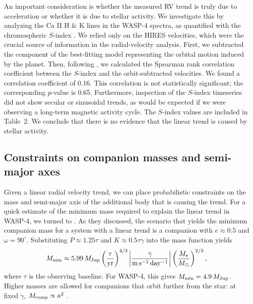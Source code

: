 \documentclass[12pt,twocolumn,tighten]{aastex62}
\begin{document}
An important consideration is whether the measured RV trend is truly
due to acceleration or whether it is due to stellar activity.  We
investigate this by analyzing the Ca II H \& K lines in the WASP-4
spectra, as quantified with the chromospheric $S$-index
\citep{wright_chromospheric_2004}.  We relied only on the HIRES
velocities, which were the crucial source of information in the
radial-velocity analysis.  First, we subtracted the component of the
best-fitting model representing the orbital motion induced by the
planet.  Then, following
\citet{bryan_statistics_2016,bryan_excess_2019}, we calculated the
Spearman rank correlation coefficient between the $S$-index and the
orbit-subtracted velocities.  We found a correlation coefficient of
0.16. This correlation is not statistically significant; the
corresponding $p$-value is 0.65.  Furthermore, inspection of the
$S$-index timeseries did not show secular or sinusoidal trends, as
would be expected if we were observing a long-term magnetic activity
cycle.  The $S$-index values are included in Table~2.  We conclude
that there is no evidence that the linear trend is caused by stellar
activity.

\subsection{Constraints on companion masses and semi-major axes}

Given a linear radial velocity trend, we can place probabilistic
constraints on the mass and semi-major axis of the additional body
that is causing the trend.  For a quick estimate of the minimum mass
required to explain the linear trend in WASP-4, we turned to
\citet{feng_california_2015}.  As they discussed, the scenario that
yields the minimum companion mass for a system with a linear trend is
a companion with $e\approx0.5$ and $\omega=90^\circ$.  Substituting
$P\approx 1.25\tau$ and $K \approx 0.5\tau \dot{\gamma}$ into the mass
function \citep[{\it e.g.},][]{wright_efficient_2009} yields
\begin{equation}
 M_{\rm min} \approx 5.99\,M_{\rm Jup}
  \left( \frac{\tau}{{\rm yr}} \right)^{4/3}
  \left| \frac{\dot{\gamma}}{{\rm m\,s^{-1}\,day^{-1}}} \right|
  \left( \frac{M_\star}{{M_\odot}} \right)^{2/3},
\end{equation}
where $\tau$ is the observing baseline.  For WASP-4, this gives
$M_{\rm min} = 4.9\,M_{\rm Jup}$.  Higher masses are allowed for
companions that orbit further from the star: at fixed $\dot{\gamma}$,
$M_{\rm comp} \propto a^2$
\citep{torres_substellar_1999,liu_crossing_2002}.
\end{document}
